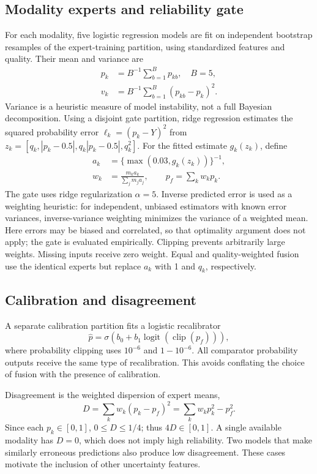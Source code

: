 \documentclass[conference]{IEEEtran}
\begin{document}
\subsection{Modality experts and reliability gate}
For each modality, five logistic regression models are fit on independent bootstrap resamples of the expert-training partition, using standardized features and quality. Their mean and variance are
\begin{align}
p_k &= B^{-1}\sum_{b=1}^{B}p_{kb},\quad B=5,\\
v_k &= B^{-1}\sum_{b=1}^{B}(p_{kb}-p_k)^2.
\end{align}
Variance is a heuristic measure of model instability, not a full Bayesian decomposition. Using a disjoint gate partition, ridge regression estimates the squared probability error $\ell_k=(p_k-Y)^2$ from $z_k=[q_k,|p_k-0.5|,q_k|p_k-0.5|,q_k^2]$. For the fitted estimate $g_k(z_k)$, define
\begin{align}
a_k&=\{\max(0.03,g_k(z_k))\}^{-1},\\
w_k&=\frac{m_ka_k}{\sum_j m_ja_j},\qquad p_f=\sum_kw_kp_k.
\end{align}
The gate uses ridge regularization $\alpha=5$. Inverse predicted error is used as a weighting heuristic: for independent, unbiased estimators with known error variances, inverse-variance weighting minimizes the variance of a weighted mean. Here errors may be biased and correlated, so that optimality argument does not apply; the gate is evaluated empirically. Clipping prevents arbitrarily large weights. Missing inputs receive zero weight. Equal and quality-weighted fusion use the identical experts but replace $a_k$ with 1 and $q_k$, respectively.
\subsection{Calibration and disagreement}
A separate calibration partition fits a logistic recalibrator
\begin{equation}
\hat p=\sigma(b_0+b_1\operatorname{logit}(\operatorname{clip}(p_f))),
\end{equation}
where probability clipping uses $10^{-6}$ and $1-10^{-6}$. All comparator probability outputs receive the same type of recalibration. This avoids conflating the choice of fusion with the presence of calibration.

Disagreement is the weighted dispersion of expert means,
\begin{equation}
D=\sum_kw_k(p_k-p_f)^2=\sum_kw_kp_k^2-p_f^2.
\end{equation}
Since each $p_k\in[0,1]$, $0\leq D\leq1/4$; thus $4D\in[0,1]$. A single available modality has $D=0$, which does not imply high reliability. Two models that make similarly erroneous predictions also produce low disagreement. These cases motivate the inclusion of other uncertainty features.
\end{document}
